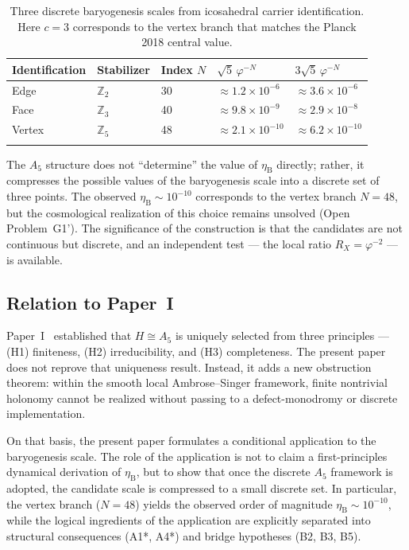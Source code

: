 \documentclass[sn-mathphys-num,Numbered]{sn-jnl}
\theoremstyle{thmstyleone}
\theoremstyle{thmstylethree}
\theoremstyle{thmstyletwo}
\newcommand{\etaB}{\eta_{\mathrm{B}}}
\begin{document}
\begin{table}[h]
\caption{Three discrete baryogenesis scales from icosahedral carrier
identification. Here $c = 3$ corresponds to the vertex branch that
matches the Planck 2018 central value.}
\label{tab:three-scales}
\begin{tabular}{@{}llll l@{}}
\toprule
Identification & Stabilizer & Index $N$ &
  $\sqrt{5}\,\varphi^{-N}$ & $3\sqrt{5}\,\varphi^{-N}$ \\
\midrule
Edge   & $\mathbb{Z}_2$ & 30 &
  $\approx 1.2\times10^{-6}$  & $\approx 3.6\times10^{-6}$ \\
Face   & $\mathbb{Z}_3$ & 40 &
  $\approx 9.8\times10^{-9}$  & $\approx 2.9\times10^{-8}$ \\
Vertex & $\mathbb{Z}_5$ & 48 &
  $\approx 2.1\times10^{-10}$ & $\approx 6.2\times10^{-10}$ \\
\botrule
\end{tabular}
\end{table}

The $A_5$ structure does not ``determine'' the value of $\etaB$
directly; rather, it compresses the possible values of the baryogenesis
scale into a discrete set of three points. The observed
$\etaB \sim 10^{-10}$ corresponds to the vertex branch $N=48$, but
the cosmological realization of this choice remains unsolved (Open
Problem~G1'). The significance of the construction is that the
candidates are not continuous but discrete, and an independent test ---
the local ratio $R_X = \varphi^{-2}$ --- is available.

\subsection{Relation to Paper~I}
\label{ssec:relation}

Paper~I~\cite{PaperI} established that $H \cong A_5$ is uniquely
selected from three principles --- (H1) finiteness, (H2) irreducibility,
and (H3) completeness. The present paper does not reprove that
uniqueness result. Instead, it adds a new obstruction theorem:
within the smooth local Ambrose--Singer framework, finite nontrivial
holonomy cannot be realized without passing to a defect-monodromy or
discrete implementation.

On that basis, the present paper formulates a conditional application to
the baryogenesis scale. The role of the application is not to claim a
first-principles dynamical derivation of $\etaB$, but to show that once
the discrete $A_5$ framework is adopted, the candidate scale is
compressed to a small discrete set. In particular, the vertex branch
($N=48$) yields the observed order of magnitude $\etaB \sim 10^{-10}$,
while the logical ingredients of the application are explicitly
separated into structural consequences (A1*, A4*) and bridge hypotheses
(B2, B3, B5).
\end{document}
